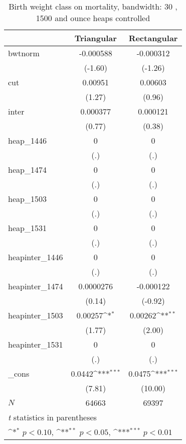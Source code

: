 \begin{table}[htbp]\centering
\def\sym#1{\ifmmode^{#1}\else\(^{#1}\)\fi}
\caption{Birth weight class on mortality, bandwidth: 30 , 1500 and ounce heaps controlled}
\begin{tabular}{l*{2}{c}}
\hline\hline
            &\multicolumn{1}{c}{Triangular}&\multicolumn{1}{c}{Rectangular}\\
\hline
bwtnorm     &   -0.000588         &   -0.000312         \\
            &     (-1.60)         &     (-1.26)         \\
[1em]
cut         &     0.00951         &     0.00603         \\
            &      (1.27)         &      (0.96)         \\
[1em]
inter       &    0.000377         &    0.000121         \\
            &      (0.77)         &      (0.38)         \\
[1em]
heap\_1446   &           0         &           0         \\
            &         (.)         &         (.)         \\
[1em]
heap\_1474   &           0         &           0         \\
            &         (.)         &         (.)         \\
[1em]
heap\_1503   &           0         &           0         \\
            &         (.)         &         (.)         \\
[1em]
heap\_1531   &           0         &           0         \\
            &         (.)         &         (.)         \\
[1em]
heapinter\_1446&           0         &           0         \\
            &         (.)         &         (.)         \\
[1em]
heapinter\_1474&   0.0000276         &   -0.000122         \\
            &      (0.14)         &     (-0.92)         \\
[1em]
heapinter\_1503&     0.00257\sym{*}  &     0.00262\sym{**} \\
            &      (1.77)         &      (2.00)         \\
[1em]
heapinter\_1531&           0         &           0         \\
            &         (.)         &         (.)         \\
[1em]
\_cons      &      0.0442\sym{***}&      0.0475\sym{***}\\
            &      (7.81)         &     (10.00)         \\
\hline
\(N\)       &       64663         &       69397         \\
\hline\hline
\multicolumn{3}{l}{\footnotesize \textit{t} statistics in parentheses}\\
\multicolumn{3}{l}{\footnotesize \sym{*} \(p<0.10\), \sym{**} \(p<0.05\), \sym{***} \(p<0.01\)}\\
\end{tabular}
\end{table}
